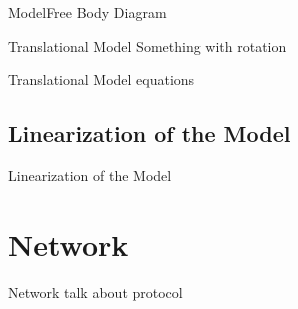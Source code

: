 \begin{frame}{Model}{Free Body Diagram}
{\begin{figure}[H]
        \end{figure}            
    }
\end{frame}

\begin{frame}{Translational Model}{}
    Something with rotation
\end{frame}

\begin{frame}{Translational Model}{}
    equations
\end{frame}

\subsection{Linearization of the Model}
\begin{frame}{Linearization of the Model}{}
    
\end{frame}

\section{Network}
\begin{frame}{Network}{}
    talk about protocol 
\end{frame}

